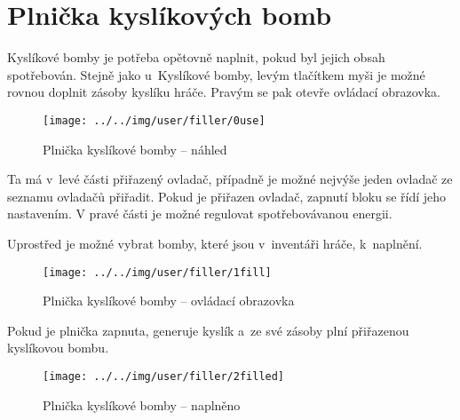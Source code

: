 
\section{Plnička kyslíkových bomb}

Kyslíkové bomby je potřeba opětovně naplnit, pokud byl jejich obsah spotřebován. Stejně jako u~Kyslíkové bomby, levým tlačítkem myši je možné rovnou doplnit zásoby kyslíku hráče. Pravým se pak otevře ovládací obrazovka.

\begin{figure}[!ht]\centering
\texttt{[image: ../../img/user/filler/0use]}

\caption{Plnička kyslíkové bomby -- náhled}
\label{fig:user_filler_0use}

\end{figure}

\FloatBarrier

Ta má v~levé části přiřazený ovladač, případně je možné nejvýše jeden ovladač ze seznamu ovladačů přiřadit. Pokud je přiřazen ovladač, zapnutí bloku se řídí jeho nastavením. V pravé části je možné regulovat spotřebovávanou energii.

Uprostřed je možné vybrat bomby, které jsou v~inventáři hráče, k~naplnění.

\begin{figure}[!ht]\centering
\texttt{[image: ../../img/user/filler/1fill]}

\caption{Plnička kyslíkové bomby -- ovládací obrazovka}
\label{fig:user_filler_1fill}

\end{figure}

\FloatBarrier

Pokud je plnička zapnuta, generuje kyslík a~ze své zásoby plní přiřazenou kyslíkovou bombu.

\begin{figure}[!ht]\centering
\texttt{[image: ../../img/user/filler/2filled]}

\caption{Plnička kyslíkové bomby -- naplněno}
\label{fig:user_filler_2filled}

\end{figure}



\FloatBarrier